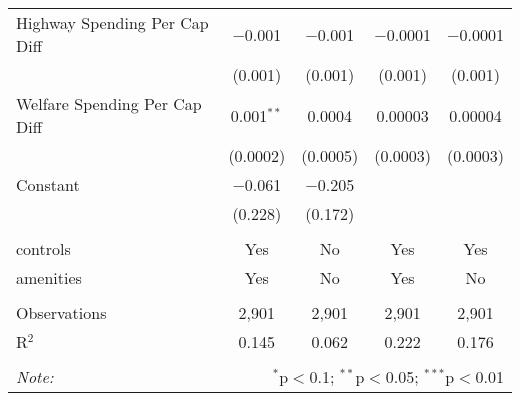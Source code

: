 \begin{table}[!htbp]
\begin{tabular}{@{\extracolsep{5pt}}lcccc}
  Highway Spending Per Cap Diff & $-$0.001 & $-$0.001 & $-$0.0001 & $-$0.0001 \\ 
  & (0.001) & (0.001) & (0.001) & (0.001) \\ 
  Welfare Spending Per Cap Diff & 0.001$^{**}$ & 0.0004 & 0.00003 & 0.00004 \\ 
  & (0.0002) & (0.0005) & (0.0003) & (0.0003) \\ 
  Constant & $-$0.061 & $-$0.205 &  &  \\ 
  & (0.228) & (0.172) &  &  \\ 
 \hline \\[-1.8ex] 
controls & Yes & No & Yes & Yes \\ 
amenities & Yes & No & Yes & No \\ 
\hline \\[-1.8ex] 
Observations & 2,901 & 2,901 & 2,901 & 2,901 \\ 
R$^{2}$ & 0.145 & 0.062 & 0.222 & 0.176 \\ 
\hline 
\hline \\[-1.8ex] 
\textit{Note:}  & \multicolumn{4}{r}{$^{*}$p$<$0.1; $^{**}$p$<$0.05; $^{***}$p$<$0.01} \\ 
\end{tabular} 
\end{table} 
